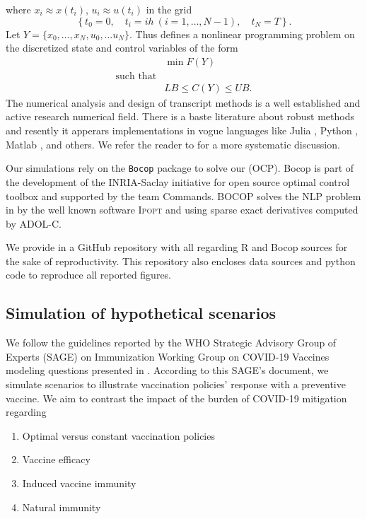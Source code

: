     where $x_i \approx x(t_i)$,
    $u_i \approx u(t_i)$ in the grid
    $$
        \left\{
            t_0 = 0,\quad
            t_i = i h \ (i=1,\dots, N-1),\quad
            t_N = T
        \right\}.
    $$
    Let $Y = \{x_0, \dots, x_N, u_0,\dots u_N\}$.
    Thus  defines a nonlinear programming problem on the
    discretized state and control variables of the form
    \begin{equation}
        \label{eqn:nlp_form}
        \begin{aligned}
            &
            \min F(Y)
        \\
        \text{such that} &
        \\
            &
            LB \leq C(Y) \leq UB .
        \end{aligned}
    \end{equation}
        The numerical analysis and design of transcript methods is a well
    established  and active research numerical field. There is a baste
    literature about robust methods and resently it apperars implementations in
    vogue languages like Julia
    \cite{DunningHuchetteLubin2017, LubinDunningIJOC}, Python \cite{libcmaes},
    Matlab \cite{matlabOpt}, and others. We refer the reader to
    \cite{Betts2001,Seywald1993} for a more systematic discussion.

        Our simulations rely on the \verb|Bocop| package
    \cite{Bocop,BocopExamples} to solve our (OCP). Bocop is part of the
    development of the INRIA-Saclay initiative for open source optimal control
    toolbox and supported by the team Commands. BOCOP solves the NLP problem in
     by the well known software \textsc{Ipopt} and using
    sparse exact derivatives computed by ADOL-C.

        We provide in \cite{gitHub} a GitHub repository with all regarding R
    and Bocop sources for the sake of reproductivity. This repository also
    encloses data sources and python code to reproduce all reported figures.

\subsection{Simulation of hypothetical scenarios}
        We follow the guidelines reported by the WHO Strategic Advisory Group
    of Experts (SAGE) on Immunization Working Group on COVID-19 Vaccines
    modeling questions presented in \cite{sage2020}. According to this SAGE's
    document, we simulate scenarios to illustrate vaccination policies'
    response with a preventive vaccine. We aim to contrast the impact of the
    burden of COVID-19 mitigation regarding
    \begin{enumerate}
        \item Optimal versus constant vaccination policies
        \item Vaccine efficacy
        \item Induced vaccine immunity
        \item Natural immunity
    \end{enumerate}

